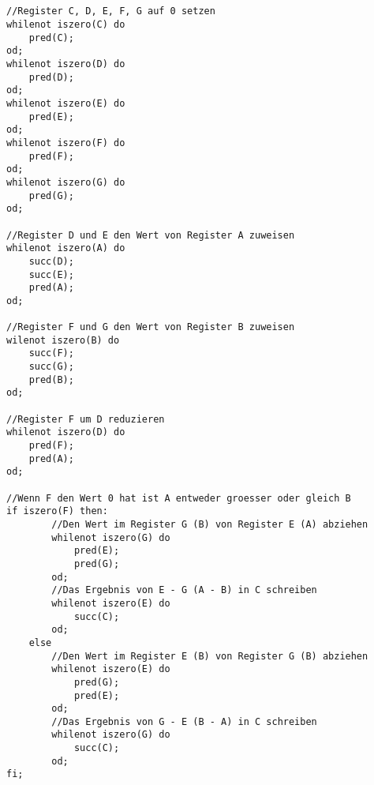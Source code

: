 \documentclass[a4paper,12pt,titlepage]{article}
\begin{document}
\subsection{}
\begin{lstlisting}[style = code]//Register C, D, E, F, G auf 0 setzen
whilenot iszero(C) do
	pred(C);
od;
whilenot iszero(D) do
	pred(D);
od;
whilenot iszero(E) do
	pred(E);
od;
whilenot iszero(F) do
	pred(F);
od;
whilenot iszero(G) do
	pred(G);
od;

//Register D und E den Wert von Register A zuweisen
whilenot iszero(A) do
	succ(D);
	succ(E);
	pred(A);
od;

//Register F und G den Wert von Register B zuweisen
wilenot iszero(B) do
	succ(F);
	succ(G);
	pred(B);
od;

//Register F um D reduzieren
whilenot iszero(D) do
	pred(F);
	pred(A);
od;

//Wenn F den Wert 0 hat ist A entweder groesser oder gleich B
if iszero(F) then:
		//Den Wert im Register G (B) von Register E (A) abziehen
		whilenot iszero(G) do
			pred(E);
			pred(G);
		od;
		//Das Ergebnis von E - G (A - B) in C schreiben
		whilenot iszero(E) do
			succ(C);
		od;
	else
		//Den Wert im Register E (B) von Register G (B) abziehen
		whilenot iszero(E) do
			pred(G);
			pred(E);
		od;
		//Das Ergebnis von G - E (B - A) in C schreiben
		whilenot iszero(G) do
			succ(C);
		od;
fi;
\end{lstlisting}
\end{document}
